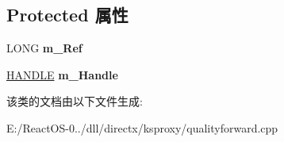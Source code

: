 \subsection*{Protected 属性}
\begin{DoxyCompactItemize}
\item 
\mbox{\label{class_c_ks_quality_forwarder_a57c5c5436cf7c7d74f13b8de78561bf6}} 
L\+O\+NG {\bfseries m\+\_\+\+Ref}
\item 
\mbox{\label{class_c_ks_quality_forwarder_a37186f2f80e25761fd7e3d1419ffa20e}} 
\hyperlink{interfacevoid}{H\+A\+N\+D\+LE} {\bfseries m\+\_\+\+Handle}
\end{DoxyCompactItemize}


该类的文档由以下文件生成\+:\begin{DoxyCompactItemize}
\item 
E\+:/\+React\+O\+S-\/0../dll/directx/ksproxy/qualityforward.\+cpp\end{DoxyCompactItemize}
